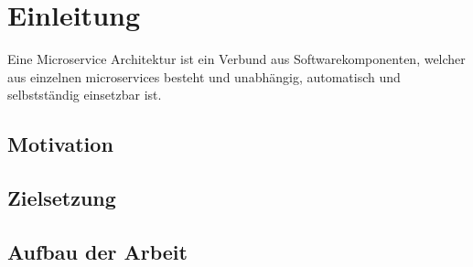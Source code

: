 \chapter{Einleitung}
Eine Microservice Architektur ist ein Verbund aus Softwarekomponenten, welcher aus einzelnen microservices besteht
und unabhängig, automatisch und selbstständig einsetzbar ist.
\section{Motivation}
\section{Zielsetzung}
\section{Aufbau der Arbeit}
